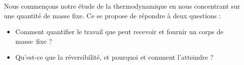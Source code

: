 Nous commençons notre étude de la thermodynamique en nous concentrant sur une quantité de masse fixe. Ce \coursdeux se propose de répondre à deux questions :
\begin{itemize}
	\item Comment quantifier le travail que peut recevoir et fournir un corps de masse~fixe ?
	\item Qu’est-ce que la réversibilité, et pourquoi et comment l’atteindre ?
\end{itemize}
